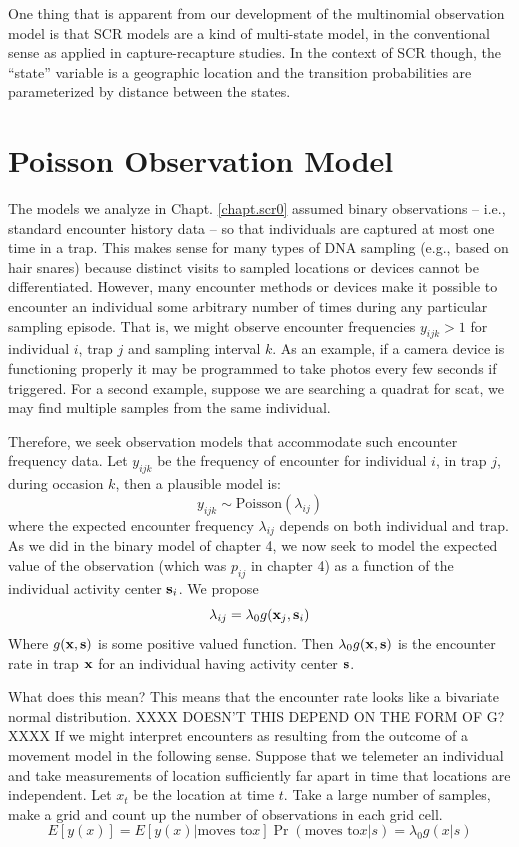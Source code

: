 One thing that is apparent from our development of the multinomial
observation model is that SCR models are a kind of multi-state model,
in the conventional sense as applied in capture-recapture studies. In
the context of SCR though, the ``state'' variable is a geographic
location and the transition probabilities are parameterized by
distance between the states. 





\section{Poisson Observation Model}

The models we analyze in Chapt. \ref{chapt.scr0} assumed binary
observations -- i.e., standard encounter history data -- so
that individuals are captured at most one time in a trap.  This makes
sense for many types of DNA sampling (e.g., based on hair snares)
because distinct visits to sampled locations or devices cannot be
differentiated. However, many encounter methods or devices make it
possible to encounter an individual some arbitrary number of times
during any particular sampling episode. That is, we might observe
encounter frequencies $y_{ijk}>1$ 
for individual $i$, trap $j$ and
sampling interval $k$.  As an example, if a camera device is
functioning properly it may be programmed to take photos every few
seconds if triggered.  For a second example, suppose we are searching
a quadrat for scat, we may find multiple samples from the same
individual.

Therefore, we seek observation models that accommodate such encounter
frequency data.  Let $y_{ijk}$ be the frequency of encounter for
individual $i$, in trap $j$, during occasion $k$, then a plausible
model is:
\[
 y_{ijk} \sim \mbox{Poisson}(\lambda_{ij})
\]
where the expected encounter frequency $\lambda_{ij}$ depends on both
individual and trap. As we did in the binary model of chapter 4, we
now seek to model the expected value of the observation (which was
$p_{ij}$ in chapter 4) as a function of the individual activity center
${\bf s}_{i}$.
We propose 
\[
 \lambda_{ij} = \lambda_{0}  g({\bf x}_{j},{\bf s}_{i})
\]
Where $g({\bf x},{\bf s})$ is some positive valued function. 
Then $\lambda_{0}g({\bf x},{\bf s})$ is the encounter rate in trap
${\bf x}$ for an individual having activity center ${\bf s}$.  

What does this mean? This means that the encounter rate looks like a
bivariate normal distribution.  
XXXX DOESN'T THIS DEPEND ON THE FORM OF G? XXXX
If we might interpret encounters as
resulting from the outcome of a movement model in the following
sense. Suppose that we telemeter an individual and take measurements
of location sufficiently far apart in time that locations are
independent. Let $x_{t}$ be the location at time $t$. Take a large
number of samples, make a grid and count up the number of observations
in each grid cell.
\[
 E[y(x)] = E[y(x)| \mbox{moves to} x]\Pr(\mbox{moves to} x|s) = \lambda_{0} g(x|s)
\]

